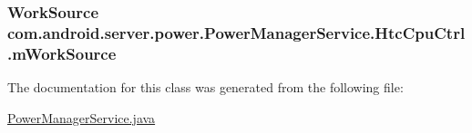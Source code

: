 \hypertarget{classcom_1_1android_1_1server_1_1power_1_1PowerManagerService_1_1HtcCpuCtrl_a29942ea13180d98f1a9e4ea444834d1b}{
\subsubsection[{m\-Work\-Source}]{\setlength{\rightskip}{0pt plus 5cm}Work\-Source com.\-android.\-server.\-power.\-Power\-Manager\-Service.\-Htc\-Cpu\-Ctrl.\-m\-Work\-Source}}\label{classcom_1_1android_1_1server_1_1power_1_1PowerManagerService_1_1HtcCpuCtrl_a29942ea13180d98f1a9e4ea444834d1b}


The documentation for this class was generated from the following file\-:\begin{DoxyCompactItemize}
\item 
\hyperlink{PowerManagerService_8java}{Power\-Manager\-Service.\-java}\end{DoxyCompactItemize}
